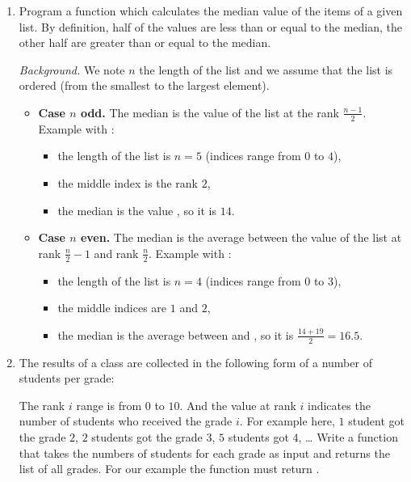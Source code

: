 \documentclass[11pt,class=report,crop=false]{standalone}
\begin{document}
\begin{activite}


\begin{enumerate}
  \item Program a function  which calculates the median value of the items of a given list. By definition, half of the values are less than or equal to the median, the other half are greater than or equal to the median.

  \emph{Background.} We note $n$ the length of the list and we assume that the list is ordered (from the smallest to the largest element).
  \begin{itemize}
    \item \textbf{Case $n$ odd.} The median is the value of the list at the rank $\frac{n-1}{2}$.    
    Example with :
    \begin{itemize}
      \item the length of the list is $n=5$ (indices range from $0$ to $4$),
      \item the middle index is the rank $2$,
      \item the median is the value , so it is $14$.
    \end{itemize}
    
    \item \textbf{Case $n$ even.} The median is the average between the value of the list at rank $\frac{n}{2}-1$ and rank $\frac{n}{2}$.
    Example with :
    \begin{itemize}
      \item the length of the list is $n=4$ (indices range from $0$ to $3$),
      \item the middle indices are $1$ and $2$,
      \item the median is the average between  and , so it is $\frac{14+19}{2} = 16.5$.
    \end{itemize}    
   \end{itemize} 
   
   
   
     
    \item The results of a class are collected in the following form of a number of students per grade:   
    
    The rank $i$ range is from $0$ to $10$. And the value at rank $i$ indicates the number of students who received the grade $i$.
    For example here, $1$ student got the grade $2$, $2$ students got the grade $3$, $5$ students got $4$, \ldots{}  
    Write a  function that takes the numbers of students for each grade as input and returns the list of all grades. For our example the function must return \ci{[2,3,3,4,4,4,4,4,5,5,6,6,6,7,...]}.


\end{enumerate}
\end{activite}
\end{document}
